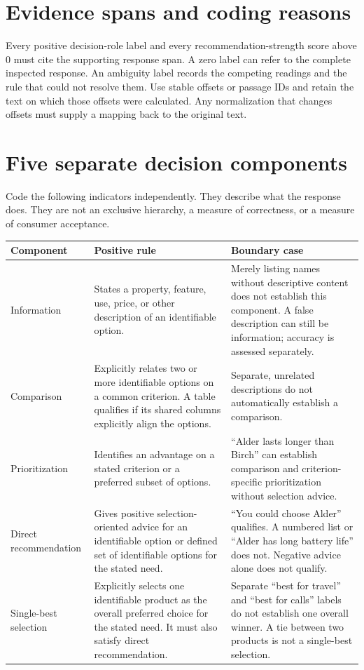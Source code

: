 \documentclass[10pt,a4paper]{article}
\begin{document}
\section{Evidence spans and coding reasons}
Every positive decision-role label and every recommendation-strength score above 0 must cite the supporting response span. A zero label can refer to the complete inspected response. An ambiguity label records the competing readings and the rule that could not resolve them. Use stable offsets or passage IDs and retain the text on which those offsets were calculated. Any normalization that changes offsets must supply a mapping back to the original text.

\medskip
\section{Five separate decision components}
Code the following indicators independently. They describe what the response does. They are not an exclusive hierarchy, a measure of correctness, or a measure of consumer acceptance.

\begin{longtable}{L{3.2cm}L{6.0cm}L{6.2cm}}
\toprule Component & Positive rule & Boundary case \\
\midrule\endhead
Information & States a property, feature, use, price, or other description of an identifiable option. & Merely listing names without descriptive content does not establish this component. A false description can still be information; accuracy is assessed separately. \\
Comparison & Explicitly relates two or more identifiable options on a common criterion. A table qualifies if its shared columns explicitly align the options. & Separate, unrelated descriptions do not automatically establish a comparison. \\
Prioritization & Identifies an advantage on a stated criterion or a preferred subset of options. & ``Alder lasts longer than Birch'' can establish comparison and criterion-specific prioritization without selection advice. \\
Direct recommendation & Gives positive selection-oriented advice for an identifiable option or defined set of identifiable options for the stated need. & ``You could choose Alder'' qualifies. A numbered list or ``Alder has long battery life'' does not. Negative advice alone does not qualify. \\
Single-best selection & Explicitly selects one identifiable product as the overall preferred choice for the stated need. It must also satisfy direct recommendation. & Separate ``best for travel'' and ``best for calls'' labels do not establish one overall winner. A tie between two products is not a single-best selection. \\
\bottomrule
\end{longtable}
\end{document}
